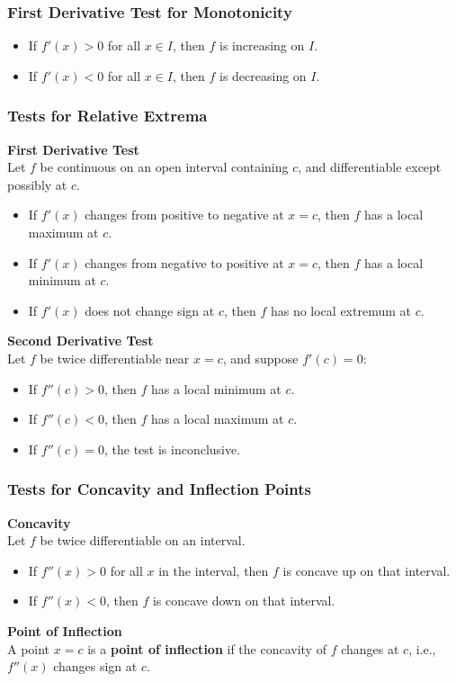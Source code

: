 \documentclass[11pt]{article}
\begin{document}
\subsubsection*{First Derivative Test for Monotonicity}
\begin{itemize}
    \item If $f'(x) > 0$ for all $x \in I$, then $f$ is increasing on $I$.
    \item If $f'(x) < 0$ for all $x \in I$, then $f$ is decreasing on $I$.
\end{itemize}
\subsubsection{Tests for Relative Extrema}
\textbf{First Derivative Test}\\[.5em]
Let $f$ be continuous on an open interval containing $c$, and differentiable except possibly at $c$.
\begin{itemize}
    \item If $f'(x)$ changes from positive to negative at $x = c$, then $f$ has a local maximum at $c$.
    \item If $f'(x)$ changes from negative to positive at $x = c$, then $f$ has a local minimum at $c$.
    \item If $f'(x)$ does not change sign at $c$, then $f$ has no local extremum at $c$.
\end{itemize}
\noindent
\textbf{Second Derivative Test}\\[.5em]
Let $f$ be twice differentiable near $x = c$, and suppose $f'(c) = 0$:
\begin{itemize}
    \item If $f''(c) > 0$, then $f$ has a local minimum at $c$.
    \item If $f''(c) < 0$, then $f$ has a local maximum at $c$.
    \item If $f''(c) = 0$, the test is inconclusive.
\end{itemize}
\subsubsection{Tests for Concavity and Inflection Points}
\textbf{Concavity}\\[.5em]
Let $f$ be twice differentiable on an interval.
\begin{itemize}
    \item If $f''(x) > 0$ for all $x$ in the interval, then $f$ is concave up on that interval.
    \item If $f''(x) < 0$, then $f$ is concave down on that interval.
\end{itemize}
\noindent
\textbf{Point of Inflection}\\[.5em]
A point $x = c$ is a \textbf{point of inflection} if the concavity of $f$ changes at $c$, i.e., $f''(x)$ changes sign at $c$.
\end{document}
